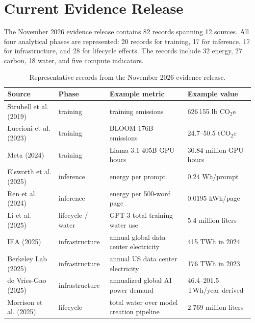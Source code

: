 \documentclass[11pt,a4paper]{article}
\begin{document}
\section{Current Evidence Release}
The November 2026 evidence release contains 82 records spanning 12 sources. All four analytical phases are represented: 20 records for training, 17 for inference, 17 for infrastructure, and 28 for lifecycle effects. The records include 32 energy, 27 carbon, 18 water, and five compute indicators.

\begin{table}[htbp]
\centering
\small
\begin{tabularx}{\textwidth}{|L{2.7cm}|L{2.2cm}|L{2.1cm}|Y|}
\hline
Source & Phase & Example metric & Example value \\
\hline
Strubell et al. (2019) \cite{strubell2019} & training & training emissions & 626\,155 lb CO$_2$e \\
\hline
Luccioni et al. (2023) \cite{luccioni2023} & training & BLOOM 176B emissions & 24.7--50.5 tCO$_2$e \\
\hline
Meta (2024) \cite{meta2024llama} & training & Llama 3.1 405B GPU-hours & 30.84 million GPU-hours \\
\hline
Elsworth et al. (2025) \cite{elsworth2025} & inference & energy per prompt & 0.24 Wh/prompt \\
\hline
Ren et al. (2024) \cite{ren2024} & inference & energy per 500-word page & 0.0195 kWh/page \\
\hline
Li et al. (2025) \cite{li2025water} & lifecycle / water & GPT-3 total training water use & 5.4 million liters \\
\hline
IEA (2025) \cite{iea2025} & infrastructure & annual global data center electricity & 415 TWh in 2024 \\
\hline
Berkeley Lab (2025) \cite{lbl2025} & infrastructure & annual US data center electricity & 176 TWh in 2023 \\
\hline
de Vries-Gao (2025) \cite{devriesgao2025joule} & infrastructure & annualized global AI power demand & 46.4--201.5 TWh/year derived \\
\hline
Morrison et al. (2025) \cite{morrison2025} & lifecycle & total water over model creation pipeline & 2.769 million liters \\
\hline
\end{tabularx}
\caption{Representative records from the November 2026 evidence release.}
\label{tab:dataset-overview}
\end{table}
\end{document}
